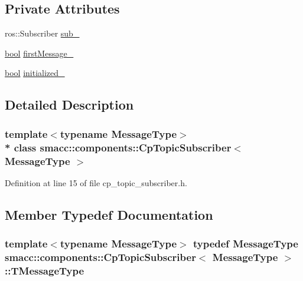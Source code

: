 \subsection*{Private Attributes}
\begin{DoxyCompactItemize}
\item 
ros\+::\+Subscriber \hyperlink{classsmacc_1_1components_1_1CpTopicSubscriber_a87f9c87f6b7c0801dff4fcc7519dbe0e}{sub\+\_\+}
\item 
\hyperlink{classbool}{bool} \hyperlink{classsmacc_1_1components_1_1CpTopicSubscriber_aadbaf8c0f0a2a5bea38f41356528f41c}{first\+Message\+\_\+}
\item 
\hyperlink{classbool}{bool} \hyperlink{classsmacc_1_1components_1_1CpTopicSubscriber_a666e60629820ef146ade691a36c41e0a}{initialized\+\_\+}
\end{DoxyCompactItemize}


\subsection{Detailed Description}
\subsubsection*{template$<$typename Message\+Type$>$\\*
class smacc\+::components\+::\+Cp\+Topic\+Subscriber$<$ Message\+Type $>$}



Definition at line 15 of file cp\+\_\+topic\+\_\+subscriber.\+h.



\subsection{Member Typedef Documentation}
\subsubsection[{\texorpdfstring{T\+Message\+Type}{TMessageType}}]{\setlength{\rightskip}{0pt plus 5cm}template$<$typename Message\+Type$>$ typedef Message\+Type {\bf smacc\+::components\+::\+Cp\+Topic\+Subscriber}$<$ Message\+Type $>$\+::{\bf T\+Message\+Type}}\hypertarget{classsmacc_1_1components_1_1CpTopicSubscriber_acdc1cefead832fd249b0fceb2c3b28b0}{}\label{classsmacc_1_1components_1_1CpTopicSubscriber_acdc1cefead832fd249b0fceb2c3b28b0}


